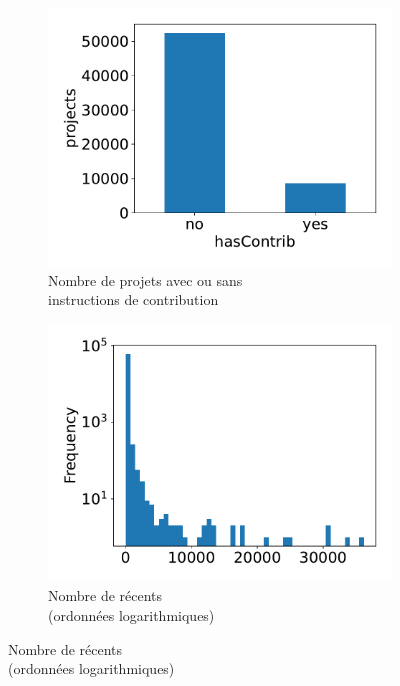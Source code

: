 \begin{figure}
    \begin{subfigure}[t]{0.5\textwidth}
        \includegraphics[width=\textwidth]{experiment/data_analysis/hasContrib_Count}
        \caption{Nombre de projets avec ou sans\\instructions de contribution}
    \end{subfigure}%
    \begin{subfigure}[t]{0.5\textwidth}
        \includegraphics[width=\textwidth]{experiment/data_analysis/recentCommitCount_distribution}
        \caption{Nombre de  récents\\(ordonnées logarithmiques)}
    \end{subfigure}


\end{figure}
